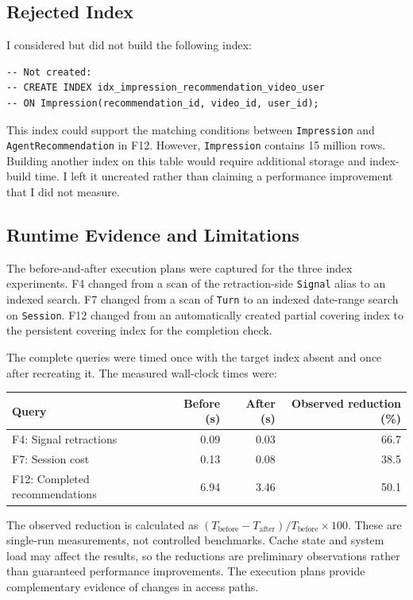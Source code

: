 \documentclass[11pt,a4paper]{article}
\begin{document}
\subsection{Rejected Index}

I considered but did not build the following index:

\begin{lstlisting}[style=sqlstyle]
-- Not created:
-- CREATE INDEX idx_impression_recommendation_video_user
-- ON Impression(recommendation_id, video_id, user_id);
\end{lstlisting}

This index could support the matching conditions between
\texttt{Impression} and \texttt{AgentRecommendation} in F12.
However, \texttt{Impression} contains 15 million rows. Building
another index on this table would require additional storage and
index-build time. I left it uncreated rather than claiming a
performance improvement that I did not measure.

\subsection{Runtime Evidence and Limitations}

The before-and-after execution plans were captured for the three
index experiments. F4 changed from a scan of the retraction-side
\texttt{Signal} alias to an indexed search. F7 changed from a scan
of \texttt{Turn} to an indexed date-range search on
\texttt{Session}. F12 changed from an automatically created
partial covering index to the persistent covering index for the
completion check.

The complete queries were timed once with the target index absent
and once after recreating it. The measured wall-clock times were:

\begin{center}
\begin{tabular}{lrrr}
\toprule
Query & Before (s) & After (s) & Observed reduction (\%) \\
\midrule
F4: Signal retractions & 0.09 & 0.03 & 66.7 \\
F7: Session cost & 0.13 & 0.08 & 38.5 \\
F12: Completed recommendations & 6.94 & 3.46 & 50.1 \\
\bottomrule
\end{tabular}
\end{center}

The observed reduction is calculated as
$(T_{\mathrm{before}}-T_{\mathrm{after}})/T_{\mathrm{before}}
\times 100$. These are single-run measurements, not controlled
benchmarks. Cache state and system load may affect the results, so
the reductions are preliminary observations rather than guaranteed
performance improvements. The execution plans provide complementary
evidence of changes in access paths.
\end{document}
